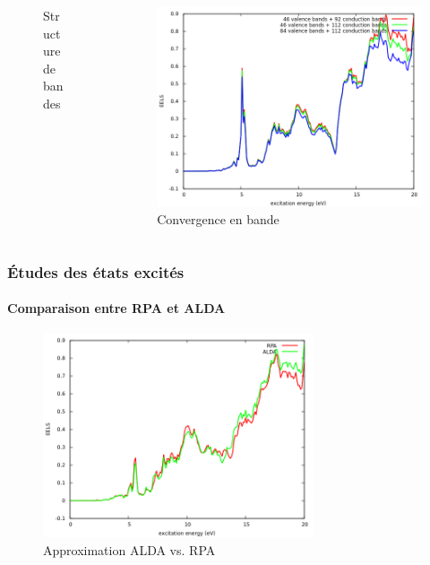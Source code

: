 \documentclass[french]{beamer}
\begin{document}
\begin{frame}
\begin{columns}
\begin{column}{\paperwidth-10pt}
\begin{figure}[!h]
    \caption{\centering Structure de bandes}\label{fig-band_3}
    \end{figure}
  \end{column}
  \begin{column}{\paperwidth-10pt}
    \begin{figure}[!h]
    \centering
    \includegraphics[width=\textwidth]{nbd_compare}
    \caption{Convergence en bande}\label{fig-cv_nbd_3}
    \end{figure}
  \end{column}
\end{columns}

\end{frame}


\begin{frame}
\frametitle{Études des états excités}
\framesubtitle{Comparaison entre RPA et ALDA}
\begin{figure}[!h]
    \centering
    \includegraphics[width=8cm]{alda_vs_rpa}
    \caption{Approximation ALDA vs. RPA}\label{fig-alda_vs_rpa}
\end{figure}

\end{frame}
\end{document}

